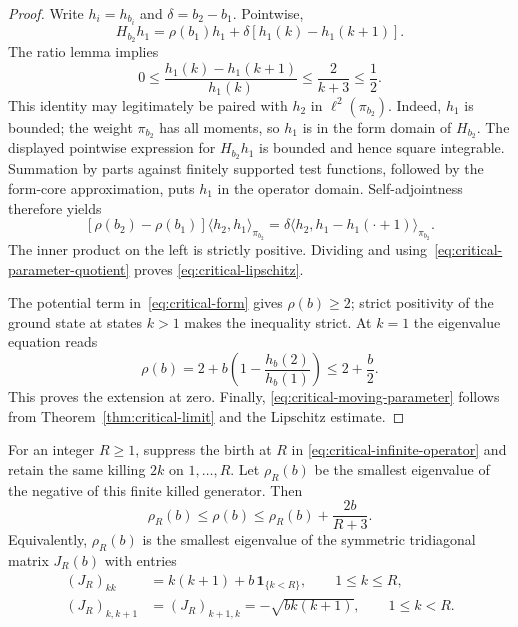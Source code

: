 \begin{proof}
Write $h_i=h_{b_i}$ and $\delta=b_2-b_1$.  Pointwise,
\[
 H_{b_2}h_1
 =\rho(b_1)h_1+\delta[h_1(k)-h_1(k+1)].
\]
The ratio lemma implies
\begin{equation}\label{eq:critical-parameter-quotient}
 0\leq\frac{h_1(k)-h_1(k+1)}{h_1(k)}
 \leq\frac2{k+3}\leq\frac12.
\end{equation}
This identity may legitimately be paired with $h_2$ in
$\ell^2(\pi_{b_2})$.  Indeed, $h_1$ is bounded; the weight
$\pi_{b_2}$ has all moments, so $h_1$ is in the form domain of
$H_{b_2}$.  The displayed pointwise expression for $H_{b_2}h_1$ is
bounded and hence square integrable.  Summation by parts against
finitely supported test functions, followed by the form-core
approximation, puts $h_1$ in the operator domain.  Self-adjointness
therefore yields
\[
 [\rho(b_2)-\rho(b_1)]\langle h_2,h_1\rangle_{\pi_{b_2}}
 =\delta\langle h_2,h_1-h_1(\cdot+1)\rangle_{\pi_{b_2}}.
\]
The inner product on the left is strictly positive.  Dividing and
using~\eqref{eq:critical-parameter-quotient} proves
\eqref{eq:critical-lipschitz}.

The potential term in~\eqref{eq:critical-form} gives $\rho(b)\geq2$;
strict positivity of the ground state at states $k>1$ makes the
inequality strict.  At $k=1$ the eigenvalue equation reads
\[
 \rho(b)=2+b\left(1-\frac{h_b(2)}{h_b(1)}\right)\leq2+\frac b2.
\]
This proves the extension at zero.  Finally,
\eqref{eq:critical-moving-parameter} follows from
Theorem~\ref{thm:critical-limit} and the Lipschitz estimate.
\end{proof}

\begin{proposition}
\label{prop:critical-truncation}
For an integer $R\geq1$, suppress the birth at $R$ in
\eqref{eq:critical-infinite-operator} and retain the same killing
$2k$ on $1,\ldots,R$.  Let $\rho_R(b)$ be the smallest eigenvalue of
the negative of this finite killed generator.  Then
\begin{equation}\label{eq:critical-truncation-error}
 \rho_R(b)\leq\rho(b)
 \leq\rho_R(b)+\frac{2b}{R+3}.
\end{equation}
Equivalently, $\rho_R(b)$ is the smallest eigenvalue of the symmetric
tridiagonal matrix $J_R(b)$ with entries
\begin{equation}\label{eq:critical-jacobi-matrix}
 \begin{split}
 (J_R)_{kk}&=k(k+1)+b\,\mathbf1_{\{k<R\}},\qquad 1\leq k\leq R,\\
 (J_R)_{k,k+1}&=(J_R)_{k+1,k}=-\sqrt{bk(k+1)},
       \qquad 1\leq k<R.
 \end{split}
\end{equation}
\end{proposition}

